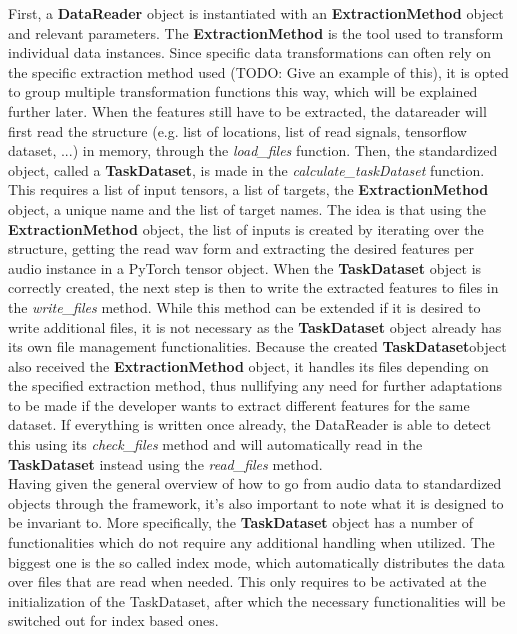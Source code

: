 First, a \textbf{DataReader} object is instantiated with an \textbf{ExtractionMethod} object and relevant parameters. The \textbf{ExtractionMethod} is the tool used to transform individual data instances. Since specific data transformations can often rely on the specific extraction method used (TODO: Give an example of this), it is opted to group multiple transformation functions this way, which will be explained further later. When the features still have to be extracted, the datareader will first read the structure (e.g. list of locations, list of read signals, tensorflow dataset, ...) in memory, through the \textit{load\_files} function. Then, the standardized object, called a \textbf{TaskDataset}, is made in the \textit{calculate\_taskDataset} function. This requires a list of input tensors, a list of targets, the \textbf{ExtractionMethod} object, a unique name and the list of target names. The idea is that using the \textbf{ExtractionMethod} object, the list of inputs is created by iterating over the structure, getting the read wav form and extracting the desired features per audio instance in a PyTorch tensor object. When the \textbf{TaskDataset} object is correctly created, the next step is then to write the extracted features to files in the \textit{write\_files} method. While this method can be extended if it is desired to write additional files, it is not necessary as the \textbf{TaskDataset} object already has its own file management functionalities. Because the created \textbf{TaskDataset}object also received the \textbf{ExtractionMethod} object, it handles its files depending on the specified extraction method, thus nullifying any need for further adaptations to be made if the developer wants to extract different features for the same dataset. If everything is written once already, the DataReader is able to detect this using its \textit{check\_files} method and will automatically read in the \textbf{TaskDataset} instead using the \textit{read\_files} method.\\
	
Having given the general overview of how to go from audio data to standardized objects through the framework, it's also important to note what it is designed to be invariant to. More specifically, the \textbf{TaskDataset} object has a number of functionalities which do not require any additional handling when utilized. The biggest one is the so called index mode, which automatically distributes the data over files that are read when needed. This only requires to be activated at the initialization of the TaskDataset, after which the necessary functionalities will be switched out for index based ones. \\

